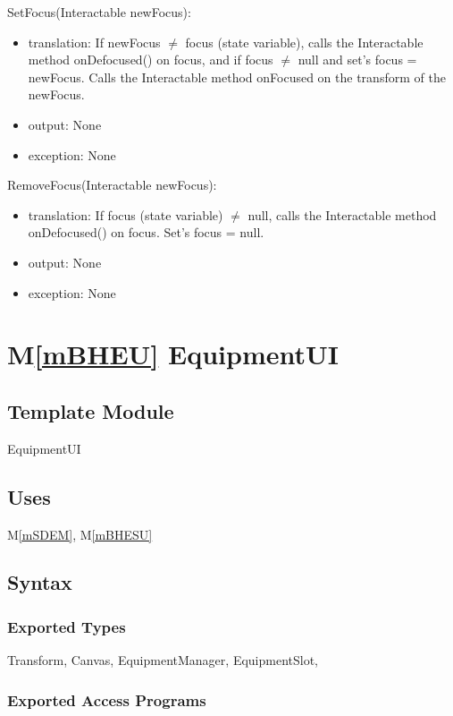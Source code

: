 \documentclass[12pt]{article}
\newcommand{\mref}[1]{M\ref{#1}}
\begin{document}
\noindent SetFocus(Interactable newFocus):
\begin{itemize}
\item translation: If newFocus $\neq$ focus (state variable), calls the Interactable method onDefocused() on focus, and if focus $\neq$ null and set's focus = newFocus. Calls the Interactable method onFocused on the transform of the newFocus.
\item output: None
\item exception: None
\end{itemize}

\noindent RemoveFocus(Interactable newFocus):
\begin{itemize}
\item translation: If focus (state variable) $\neq$ null, calls the Interactable method onDefocused() on focus. Set's focus = null.
\item output: None
\item exception: None
\end{itemize}

\newpage

\section* {\mref{mBHEU} EquipmentUI}

\subsection*{Template Module}

EquipmentUI

\subsection* {Uses}

\mref{mSDEM}, \mref{mBHESU}

\subsection* {Syntax}

\subsubsection* {Exported Types}

Transform, Canvas, EquipmentManager, EquipmentSlot, 

\subsubsection* {Exported Access Programs}
\end{document}
